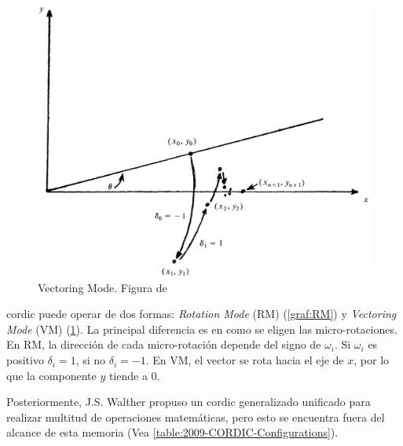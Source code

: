 \begin{figure}[ht]
	\centering
	\includegraphics[width=\textwidth]{archivos/CORDIC/VectoringMode.png}
	\caption{Vectoring Mode. Figura de \cite{schelin_calculator_1983}}
	\label{graf:VM}
\end{figure}

\gls{cordic} puede operar de dos formas: \textit{Rotation Mode} (RM) (\ref{graf:RM}) y \textit{Vectoring Mode} (VM) (\ref{graf:VM}). La principal diferencia es en como se eligen las micro-rotaciones. En RM, la dirección de cada micro-rotación depende del signo de $\omega_{i}$. Si $\omega_{i}$ es positivo $\delta_{i} = 1$, si no $\delta_{i} = -1$. En VM, el vector se rota hacia el eje de $x$, por lo que la componente $y$ tiende a 0.

Posteriormente, J.S. Walther propuso un \gls{cordic} generalizado unificado para realizar multitud de operaciones matemáticas, pero esto se encuentra fuera del alcance de esta memoria (Vea \ref{table:2009-CORDIC-Configurations}).

